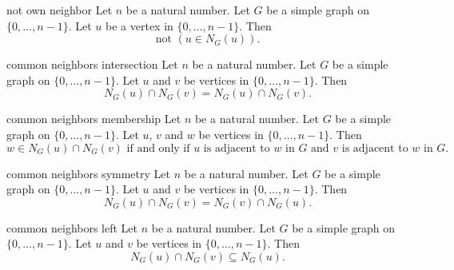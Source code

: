 \begin{cleanresult}{not own neighbor}
Let $n$ be a natural number.
Let $G$ be a simple graph on $\{0,\ldots,n-1\}$.
Let $u$ be a vertex in $\{0,\ldots,n-1\}$.
Then \[\text{not }\left(u\in N_{G}(u)\right).\]
\end{cleanresult}

\begin{cleanresult}{common neighbors intersection}
Let $n$ be a natural number.
Let $G$ be a simple graph on $\{0,\ldots,n-1\}$.
Let $u$ and $v$ be vertices in $\{0,\ldots,n-1\}$.
Then \[N_{G}(u)\cap N_{G}(v)=N_{G}(u)\cap N_{G}(v).\]
\end{cleanresult}

\begin{cleanresult}{common neighbors membership}
Let $n$ be a natural number.
Let $G$ be a simple graph on $\{0,\ldots,n-1\}$.
Let $u$, $v$ and $w$ be vertices in $\{0,\ldots,n-1\}$.
Then \[w\in N_{G}(u)\cap N_{G}(v)\text{ if and only if }u\text{ is adjacent to }w\text{ in }G\text{ and }v\text{ is adjacent to }w\text{ in }G.\]
\end{cleanresult}

\begin{cleanresult}{common neighbors symmetry}
Let $n$ be a natural number.
Let $G$ be a simple graph on $\{0,\ldots,n-1\}$.
Let $u$ and $v$ be vertices in $\{0,\ldots,n-1\}$.
Then \[N_{G}(u)\cap N_{G}(v)=N_{G}(v)\cap N_{G}(u).\]
\end{cleanresult}

\begin{cleanresult}{common neighbors left}
Let $n$ be a natural number.
Let $G$ be a simple graph on $\{0,\ldots,n-1\}$.
Let $u$ and $v$ be vertices in $\{0,\ldots,n-1\}$.
Then \[N_{G}(u)\cap N_{G}(v)\subseteq N_{G}(u).\]
\end{cleanresult}

